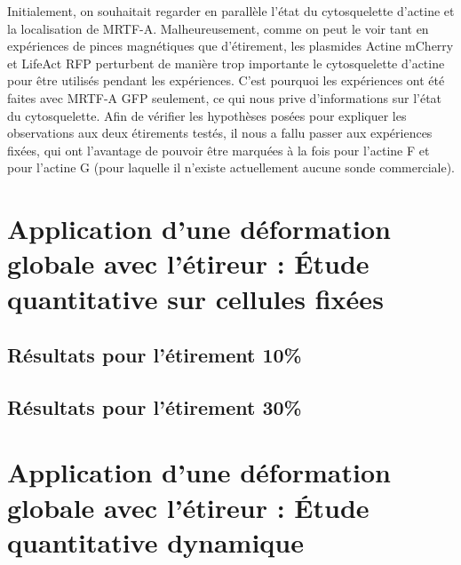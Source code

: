 \documentclass{report}
\begin{document}
Initialement, on souhaitait regarder en parallèle l'état du cytosquelette d'actine et la localisation de MRTF-A. 
Malheureusement, comme on peut le voir tant en expériences de pinces magnétiques que d'étirement, les plasmides Actine mCherry et LifeAct RFP perturbent de manière trop importante le cytosquelette d'actine pour être utilisés pendant les expériences. 
C'est pourquoi les expériences ont été faites avec MRTF-A GFP seulement, ce qui nous prive d'informations sur l'état du cytosquelette.
Afin de vérifier les hypothèses posées pour expliquer les observations aux deux étirements testés, il nous a fallu passer aux expériences fixées, qui ont l'avantage de pouvoir être marquées à la fois pour l'actine F et pour l'actine G (pour laquelle il n'existe actuellement aucune sonde commerciale). 

\section{Application d'une déformation globale avec l'étireur : \'Etude quantitative sur cellules fixées}



\subsection{Résultats pour l'étirement 10\%}

\subsection{Résultats pour l'étirement 30\%}

\section{Application d'une déformation globale avec l'étireur : \'Etude quantitative dynamique}
\end{document}
